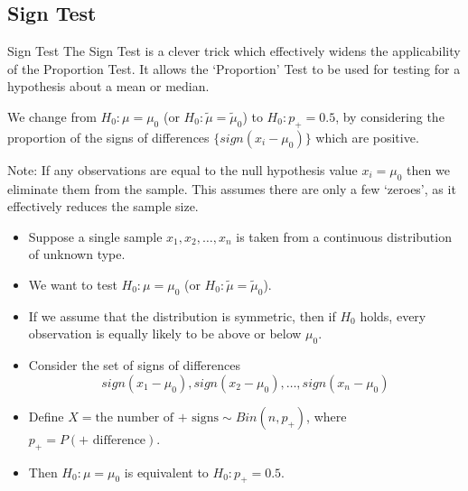 \documentclass[t,xcolor=pdftex,dvipsnames,table]{beamer}\usepackage[]{graphicx}\usepackage[]{color}
\begin{document}
\subsection[Sign Test]{Sign Test}
\begin{frame}[fragile]{Sign Test}
The Sign Test is a clever trick which effectively widens the applicability of the Proportion Test. It allows the `Proportion' Test to be used for testing for a hypothesis about a mean or median.

\vspace{.5cm}
We change from $H_{0}: \mu = \mu_{0}$ (or $H_{0}: \tilde{\mu} = \tilde{\mu}_{0}$) to $H_{0}: p_{+} = 0.5$, by considering the proportion of the signs of differences $\{ sign(x_{i}-\mu_{0})\}$ which are positive.

\vspace{.5cm}
Note:
If any observations are equal to the null hypothesis value $x_{i} = \mu_{0}$ then we eliminate them from the sample. This assumes there are only a few `zeroes', as it effectively reduces the sample size.


\end{frame}  

\begin{frame}[fragile]{}
\begin{itemize}
\item 
Suppose a single sample $x_{1}, x_{2}, \ldots, x_{n}$ is taken from a continuous distribution of unknown type. 
\item We want to test $H_{0}: \mu = \mu_{0}$ (or $H_{0}: \tilde{\mu} = \tilde{\mu}_{0}$).
\item
If we assume that the distribution is symmetric, then if $H_{0}$ holds, every observation is equally likely to be above or below $\mu_{0}$. 

\item Consider the set of signs of differences 
\[ sign(x_{1}-\mu_{0}), sign(x_{2}-\mu_{0}), \ldots, sign(x_{n}-\mu_{0}) \]

\item Define $X = \mbox{the number of + signs} \sim Bin(n, p_{+})$, where
$p_{+} = P(+ \mbox{ difference})$.

\item Then $H_{0}: \mu = \mu_{0}$ is equivalent to $H_{0}: p_{+} = 0.5$. 
\end{itemize}
\end{frame}  
\end{document}
